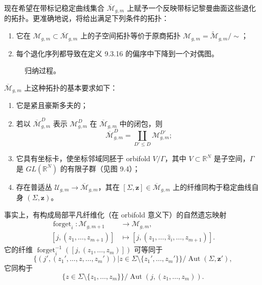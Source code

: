现在希望在带标记稳定曲线集合 $\overline{\mathcal M}_{g,m}$ 上赋予一个反映带标记黎曼曲面这些退化的拓扑。更准确地说，将给出满足下列条件的拓扑：
\begin{enumerate}[label=(\arabic*)]
 \item 它在 $\mathcal M_{g,m}\subset\overline{\mathcal M}_{g,m}$ 上的子空间拓扑等价于原商拓扑
 $\mathcal M_{g,m}=\widetilde{\mathcal M}_{g,m}/\sim$；
 \item 每个退化序列都导致在定义 9.3.16 的偏序中下降到一个对偶图。
\end{enumerate}

\begin{figure}[htbp]
 \centering
 
 \caption{归纳过程。}
 \label{fig:inductive-procedure-orbifold-charts}
\end{figure}

$\overline{\mathcal M}_{g,m}$ 上这种拓扑的基本要求如下：
\begin{enumerate}[label=(\arabic*)]
 \item 它是紧且豪斯多夫的；
 \item 若以 $\overline{\mathcal M}_{g,m}^D$ 表示
 $\mathcal M_{g,m}^D$ 在 $\overline{\mathcal M}_{g,m}$ 中的闭包，则
 \[
  \overline{\mathcal M}_{g,m}^D
  =\coprod_{D'\leq D}\mathcal M_{g,m}^{D'};
 \]
 \item 它具有坐标卡，使坐标邻域同胚于 orbifold $V/\Gamma$，其中
 $V\subset\mathbb R^N$ 是子空间，$\Gamma$ 是
 $GL(\mathbb R^N)$ 的有限子群（见图 9.4）；
 \item 存在普适丛
 $\mathcal U_{g,m}\to\overline{\mathcal M}_{g,m}$，其在
 $[\Sigma,\mathbf z]\in\overline{\mathcal M}_{g,m}$ 上的纤维同构于稳定曲线自身 $(\Sigma,\mathbf z)$。
\end{enumerate}

事实上，有构成局部平凡纤维化（在 orbifold 意义下）的自然遗忘映射
\begin{equation}
\begin{split}
 \operatorname{forget}_i:\mathcal M_{g,m+1}&\longrightarrow\mathcal M_{g,m},\\
 [j,(z_1,\ldots,z_{m+1})]&\longmapsto
 [j,(z_1,\ldots,\widehat z_i,\ldots,z_{m+1})].
\end{split}
 \label{eq:forgetful-map-smooth-marked-curves}
\end{equation}
它的纤维
$\operatorname{forget}_i^{-1}([j,(z_1,\ldots,z_m)])$ 可等同于
\[
 \bigl\{(j',(z_1',\ldots,z,\ldots,z_m'))\mathrel{\big|}
 z\in\Sigma\setminus\{z_1',\ldots,z_m'\}\bigr\}/
 \operatorname{Aut}(\Sigma,\mathbf z'),
\]
它同构于
\[
 \{z\in\Sigma\setminus\{z_1,\ldots,z_m\}\}/
 \operatorname{Aut}(j,(z_1,\ldots,z_m)).
\]

